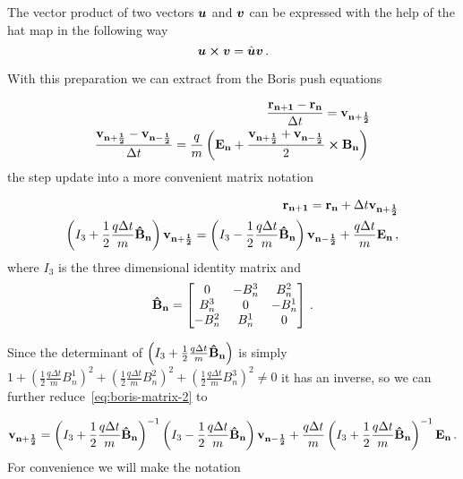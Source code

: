 \documentclass[12pt, class=report, crop=false]{standalone}
\begin{document}
\begin{proposition}
  The vector product of two vectors \(\vb*{u}\) and \(\vb*{v}\) can be expressed with the help of the hat map in the following way
  \[
    \vb*{u}\cp \vb*{v} = \hat{\vb*{u}} \vb*{v}\,.
  \]
\end{proposition}

With this preparation we can extract from the Boris push equations

\begin{subequations}
  \begin{align}
    \frac{\vb{r_{n+1}} - \vb{r_n}}{\Delta t} = \vb{v_{n+\frac{1}{2}}}\\
    \frac{\vb{v_{n+\frac{1}{2}}} - \vb{v_{n-\frac{1}{2}}} }{\Delta t} = \frac{q}{m} \left(\vb{E_n} + \frac{\vb{v_{n+\frac{1}{2}}} + \vb{v_{n-\frac{1}{2}}}}{2} \cp \vb{B_n} \right)\,
  \end{align}
\end{subequations}
the step update into a more convenient matrix notation

\begin{subequations}
  \begin{align}
    \vb{r_{n+1}} = \vb{r_n} + \Delta t \vb{v_{n+\frac{1}{2}}}\\
    \label{eq:boris-matrix-2}
    \left( I_3 + \frac{1}{2}\frac{q\Delta t}{m} \vb{\hat{B}_n} \right) \vb{v_{n+\frac{1}{2}}} = \left( I_3 - \frac{1}{2}\frac{q\Delta t}{m} \vb{\hat{B}_n} \right) \vb{v_{n-\frac{1}{2}}} + \frac{q\Delta t}{m} \vb{E_n}\,,
  \end{align}
\end{subequations}
where \(I_3\) is the three dimensional identity matrix and
\[
\vb{\hat{B}_n} = \begin{bmatrix}
  0 & -B_n^3 & B_n^2\\
  B_n^3 & 0 & -B_n^1\\
  -B_n^2 & B_n^1 & 0
\end{bmatrix}\,.
\]

Since the determinant of \(\left( I_3 + \frac{1}{2}\frac{q\Delta t}{m} \vb{\hat{B}_n} \right)\) is simply \(1+\left(\frac{1}{2}\frac{q\Delta t}{m} B_n^1\right)^2 + \left(\frac{1}{2}\frac{q\Delta t}{m} B_n^2\right)^2+ \left(\frac{1}{2}\frac{q\Delta t}{m} B_n^3\right)^2 \neq 0\) it has an inverse, so we can further reduce~\cref{eq:boris-matrix-2} to

\begin{equation}
  \vb{v_{n+\frac{1}{2}}} =\left( I_3 + \frac{1}{2}\frac{q\Delta t}{m} \vb{\hat{B}_n} \right)^{-1} \left( I_3 - \frac{1}{2}\frac{q\Delta t}{m} \vb{\hat{B}_n} \right) \vb{v_{n-\frac{1}{2}}} + \frac{q\Delta t}{m} \left( I_3 + \frac{1}{2}\frac{q\Delta t}{m} \vb{\hat{B}_n} \right)^{-1} \vb{E_n}\,.
\end{equation}
For convenience we will make the notation
\end{document}
